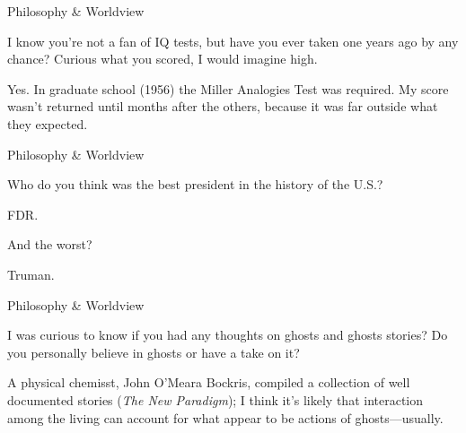 \documentclass[11pt,oneside,openany,extrafontsizes]{memoir}
\begin{document}
\begin{qaexchange}{Philosophy \& Worldview}

    \begin{question}
        I know you're not a fan of IQ tests, but have you ever taken one years ago by any chance? Curious what you scored, I would imagine high.
    \end{question}

    \begin{answer}
      Yes. In graduate school (1956) the Miller Analogies Test was required. My score wasn't returned until months after the others, because it was far outside what they expected.
    \end{answer}
\end{qaexchange}

\begin{emailexchange}{Philosophy \& Worldview}

    \begin{question}
        Who do you think was the best president in the history of the U.S.?
    \end{question}

    \begin{answer}
      FDR.
    \end{answer}

    \begin{question}
        And the worst?
    \end{question}

    \begin{answer}
      Truman.
    \end{answer}
\end{emailexchange}

\begin{qaexchange}{Philosophy \& Worldview}

    \begin{question}
        I was curious to know if you had any thoughts on ghosts and ghosts stories? Do you personally believe in ghosts or have a take on it?
    \end{question}

    \begin{answer}
      A physical chemisst, John O'Meara Bockris, compiled a collection of well documented stories (\textit{The New Paradigm}); I think it's likely that interaction among the living can account for what appear to be actions of ghosts—usually.
    \end{answer}
\end{qaexchange}
\end{document}
